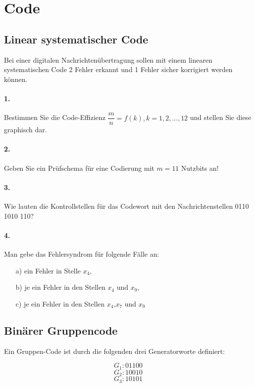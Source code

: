\documentclass[paper=a4, fontsize=11pt]{scrartcl}
\numberwithin{equation}{section}
\numberwithin{figure}{section}
\numberwithin{table}{section}
\begin{document}
\section{Code}
\subsection{Linear systematischer Code}
Bei einer digitalen Nachrichtenübertragung sollen mit einem linearen systematischen Code 2 Fehler erkannt und 1 Fehler sicher korrigiert werden können.

\paragraph{1.}
Bestimmen Sie die Code-Effizienz $\dfrac{m}{n} = f(k), k=1,2, ..., 12$ und stellen Sie diese graphisch dar. 

\paragraph{2.}
Geben Sie ein Prüfschema für eine Codierung mit $m = 11$ Nutzbits an!

\paragraph{3.}
Wie lauten die Kontrollstellen für das Codewort mit den Nachrichtenstellen 0110 1010 110?

\paragraph{4.}
Man gebe das Fehlersyndrom für folgende Fälle an:
\begin{itemize}
\item[a)] ein Fehler in Stelle $x_{4}$,
\item[b)] je ein Fehler in den Stellen $x_{4}$ und $x_{9}$,
\item[c)] je ein Fehler in den Stellen $x_{4}$,$x_{7}$ und $x_{9}$
\end{itemize}

\subsection{Binärer Gruppencode}
Ein Gruppen-Code ist durch die folgenden drei Generatorworte definiert:

$$G_{1}: 01100$$
$$G_{2}: 10010$$
$$G_{3}: 10101$$
\end{document}
